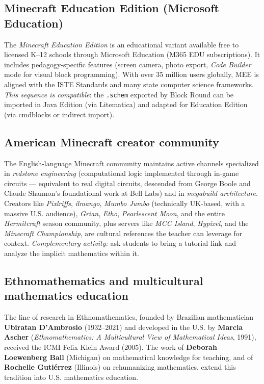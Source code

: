 \documentclass[12pt,a4paper]{scrartcl}
\newcommand{\acc}[1]{\textcolor{accent}{\textbf{#1}}}
\begin{document}
\subsection{Minecraft Education Edition (Microsoft Education)}\label{sec:mee}

The \emph{Minecraft Education Edition} is an educational variant available free to licensed K--12 schools through Microsoft Education (M365 EDU subscriptions). It includes pedagogy-specific features (screen camera, photo export, \emph{Code Builder} mode for visual block programming). With over 35 million users globally, MEE is aligned with the ISTE Standards and many state computer science frameworks. \emph{This sequence is compatible}: the \texttt{.schem} exported by Block Round can be imported in Java Edition (via Litematica) and adapted for Education Edition (via cmdblocks or indirect import).

\subsection{American Minecraft creator community}

The English-language Minecraft community maintains active channels specialized in \emph{redstone engineering} (computational logic implemented through in-game circuits --- equivalent to real digital circuits, descended from George Boole and Claude Shannon's foundational work at Bell Labs) and in \emph{megabuild architecture}. Creators like \emph{Pixlriffs}, \emph{ilmango}, \emph{Mumbo Jumbo} (technically UK-based, with a massive U.S. audience), \emph{Grian}, \emph{Etho}, \emph{Pearlescent Moon}, and the entire \emph{Hermitcraft} season community, plus servers like \emph{MCC Island}, \emph{Hypixel}, and the \emph{Minecraft Championship}, are cultural references the teacher can leverage for context. \emph{Complementary activity:} ask students to bring a tutorial link and analyze the implicit mathematics within it.

\subsection{Ethnomathematics and multicultural mathematics education}

The line of research in Ethnomathematics, founded by Brazilian mathematician \acc{Ubiratan D'Ambrosio} (1932--2021) and developed in the U.S. by \acc{Marcia Ascher} (\emph{Ethnomathematics: A Multicultural View of Mathematical Ideas}, 1991), received the ICMI Felix Klein Award (2005). The work of \acc{Deborah Loewenberg Ball} (Michigan) on mathematical knowledge for teaching, and of \acc{Rochelle Gutiérrez} (Illinois) on rehumanizing mathematics, extend this tradition into U.S. mathematics education.
\end{document}
